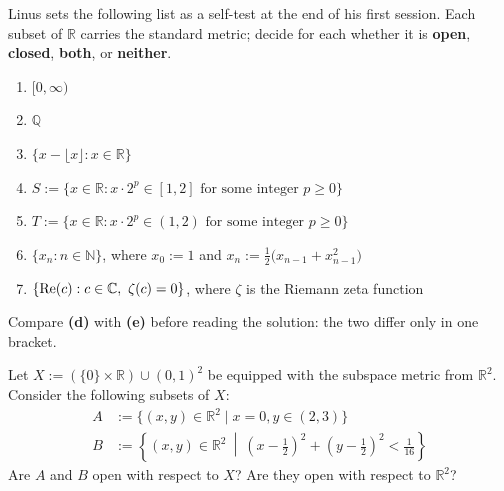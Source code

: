 \begin{exercise}
\label{ex:open_closed_self_test}
Linus sets the following list as a self-test at the end of his first session. Each subset of
$\mathbb{R}$ carries the standard metric; decide for each whether it is \textbf{open},
\textbf{closed}, \textbf{both}, or \textbf{neither}.
\begin{enumerate}[label=\textbf{(\alph*)}]
  \item $[0,\infty)$
  \item $\mathbb{Q}$
  \item $\{x - \lfloor x \rfloor : x \in \mathbb{R}\}$
  \item $S := \{x \in \mathbb{R} : x\cdot 2^p \in [1,2] \text{ for some integer } p \geq 0\}$
  \item $T := \{x \in \mathbb{R} : x\cdot 2^p \in (1,2) \text{ for some integer } p \geq 0\}$
  \item $\{x_n : n \in \mathbb{N}\}$, where $x_0 := 1$ and
    $x_n := \tfrac12\big(x_{n-1} + x_{n-1}^2\big)$
  \item $\{\Rea(c) : c \in \mathbb{C},\ \zeta(c) = 0\}$, where $\zeta$ is the Riemann zeta
    function
\end{enumerate}
Compare \textbf{(d)} with \textbf{(e)} before reading the solution: the two differ only in one
bracket.
\end{exercise}

\begin{exercise}
\label{ex:relative_openness_subsets}
Let $X := (\{0\} \times \mathbb{R}) \cup (0,1)^2$ be equipped with the subspace metric from $\mathbb{R}^2$. Consider the following subsets of $X$:
\begin{align*}
  A &:= \{(x,y) \in \mathbb{R}^2 \mid x = 0, y \in (2,3)\} \\
  B &:= \left\{(x,y) \in \mathbb{R}^2 \ \middle|\ \left(x - \tfrac12\right)^2 + \left(y - \tfrac12\right)^2 < \tfrac{1}{16}\right\}
\end{align*}
Are $A$ and $B$ open with respect to $X$? Are they open with respect to $\mathbb{R}^2$?
\end{exercise}

